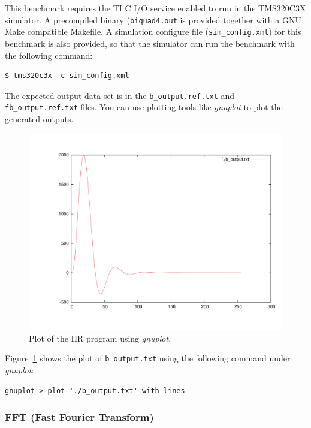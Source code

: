 This benchmark requires the TI C I/O service enabled to run in the TMS320C3X simulator.
A precompiled binary (\texttt{biquad4.out} is provided together with a GNU Make compatible Makefile.
A simulation configure file (\texttt{sim\_config.xml}) for this benchmark is also provided, so that the simulator can run the benchmark with the following command:
  
\begin{verbatim}
$ tms320c3x -c sim_config.xml
\end{verbatim}

The expected output data set is in the \texttt{b\_output.ref.txt} and \texttt{fb\_output.ref.txt} files.
You can use plotting tools like \textit{gnuplot} to plot the generated outputs. 

\begin{figure}[!h]
	\begin{center}
		\includegraphics[width=.8\textwidth]{tms320c3x/fig_iir_output.pdf}
		\caption{\label{fig:tms320c3x_manual_iir_output}Plot of the IIR program using \textit{gnuplot}.}
	\end{center}
\end{figure}

Figure~\ref{fig:tms320c3x_manual_iir_output} shows the plot of \texttt{b\_output.txt} using the following command under \textit{gnuplot}:

\begin{verbatim}
gnuplot > plot './b_output.txt' with lines
\end{verbatim}

\subsubsection{FFT (Fast Fourier Transform)}

